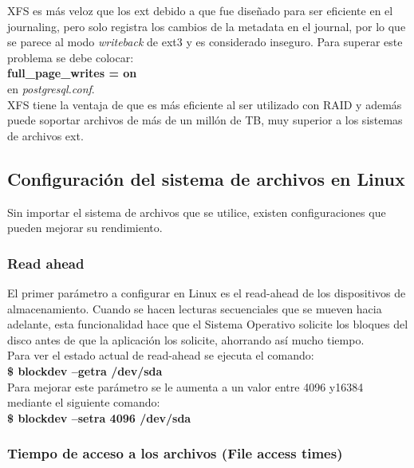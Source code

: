 XFS es más veloz que los ext debido a que fue diseñado para ser eficiente en el journaling, pero solo registra los cambios de la metadata en el journal, por lo que se parece al modo \textit{writeback} de ext3 y es considerado inseguro. Para superar este problema se debe colocar:\\

\textbf{full\_page\_writes = on}\\

en \textit{postgresql.conf}.\\

XFS tiene la ventaja de que es más eficiente al ser utilizado con RAID y además puede soportar archivos de más de un millón de TB, muy superior a los sistemas de archivos ext.

\subsection{Configuración del sistema de archivos en Linux}

Sin importar el sistema de archivos que se utilice, existen configuraciones que pueden mejorar su rendimiento.

\subsubsection{Read ahead}

El primer parámetro a configurar en Linux es el read-ahead de los dispositivos de almacenamiento. Cuando se hacen lecturas secuenciales que se mueven hacia adelante, esta funcionalidad hace que el Sistema Operativo solicite los bloques del disco antes de que la aplicación los solicite, ahorrando así mucho tiempo. \\

Para ver el estado actual de read-ahead se ejecuta el comando:\\

\textbf{\$ blockdev --getra /dev/sda}\\

Para mejorar este parámetro se le aumenta a un valor entre 4096 y16384 mediante el siguiente comando:\\

\textbf{\$ blockdev --setra 4096 /dev/sda}

\subsubsection{Tiempo de acceso a los archivos (File access times)}


